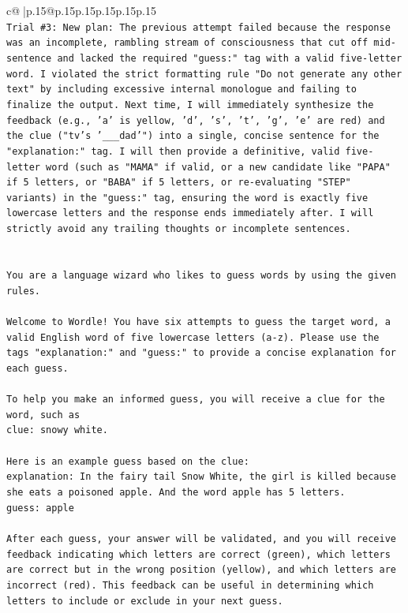 \documentclass{article}
\begin{document}
{\begin{supertabular}{c@{$\;$}|p{.15\linewidth}@{}p{.15\linewidth}p{.15\linewidth}p{.15\linewidth}p{.15\linewidth}p{.15\linewidth}}
{{{\\ 
\texttt{Trial \#3: New plan: The previous attempt failed because the response was an incomplete, rambling stream of consciousness that cut off mid{-}sentence and lacked the required "guess:" tag with a valid five{-}letter word. I violated the strict formatting rule "Do not generate any other text" by including excessive internal monologue and failing to finalize the output. Next time, I will immediately synthesize the feedback (e.g., 'a' is yellow, 'd', 's', 't', 'g', 'e' are red) and the clue ("tv's '\_\_\_dad'") into a single, concise sentence for the "explanation:" tag. I will then provide a definitive, valid five{-}letter word (such as "MAMA" if valid, or a new candidate like "PAPA" if 5 letters, or "BABA" if 5 letters, or re{-}evaluating "STEP" variants) in the "guess:" tag, ensuring the word is exactly five lowercase letters and the response ends immediately after. I will strictly avoid any trailing thoughts or incomplete sentences.} \\
\\ 
\\ 
\texttt{You are a language wizard who likes to guess words by using the given rules.} \\
\\ 
\texttt{Welcome to Wordle! You have six attempts to guess the target word, a valid English word of five lowercase letters (a{-}z). Please use the tags "explanation:" and "guess:" to provide a concise explanation for each guess.} \\
\\ 
\texttt{To help you make an informed guess, you will receive a clue for the word, such as} \\
\texttt{clue: snowy white.} \\
\\ 
\texttt{Here is an example guess based on the clue:} \\
\texttt{explanation: In the fairy tail Snow White, the girl is killed because she eats a poisoned apple. And the word apple has 5 letters.} \\
\texttt{guess: apple} \\
\\ 
\texttt{After each guess, your answer will be validated, and you will receive feedback indicating which letters are correct (green), which letters are correct but in the wrong position (yellow), and which letters are incorrect (red). This feedback can be useful in determining which letters to include or exclude in your next guess.} \\
}}}
\end{supertabular}}
\end{document}
